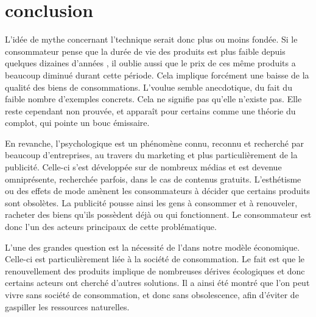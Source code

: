 \chapter*{conclusion}

%
%
%
%
%

L'idée de mythe concernant l'\op technique serait donc plus ou moins fondée. Si le consommateur pense que la durée de vie des produits est plus faible depuis quelques dizaines d'années , il oublie aussi que le prix de ces même produits a beaucoup diminué durant cette période. Cela implique forcément une baisse de la qualité des biens de consommations. L'\op voulue semble anecdotique, du fait du faible nombre d'exemples concrets. Cela ne signifie pas qu'elle n'existe pas. Elle reste cependant non prouvée, et apparaît pour certains comme une théorie du complot, qui pointe un bouc émissaire. 

En revanche, l'\op psychologique est un phénomène connu, reconnu et recherché par beaucoup d'entreprises, au travers du marketing et plus particulièrement de la publicité. Celle-ci s'est développée sur de nombreux médias et est devenue omniprésente, recherchée parfois, dans le cas de contenus gratuits. L'esthétisme ou des effets de mode amènent les consommateurs à décider que certains produits sont obsolètes. La publicité pousse ainsi les gens à consommer et à renouveler, racheter des biens qu'ils possèdent déjà ou qui fonctionnent. Le consommateur est donc l'un des acteurs principaux de cette problématique.

L'une des grandes question est la nécessité de l'\op dans notre modèle économique. Celle-ci est particulièrement liée à la société de consommation. Le fait est que le renouvellement des produits implique de nombreuses dérives écologiques et donc certains acteurs ont cherché d'autres solutions. Il a ainsi été montré que l'on peut vivre sans société de consommation, et donc sans obsolescence, afin d'éviter de gaspiller les ressources naturelles.